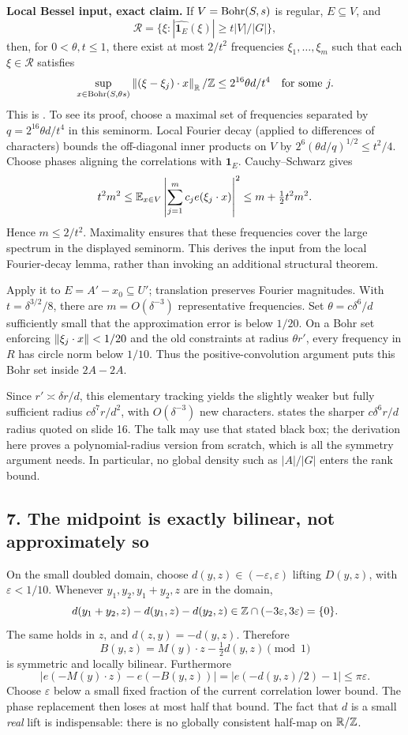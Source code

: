 \textbf{Local Bessel input, exact claim.}
If $V=\operatorname{Bohr}(S,s)$ is regular, $E\subseteq V$, and
\[\mathcal R=\{\xi:|\widehat{\mathbf1_E}(\xi)|\geq t|V|/|G|\},\]
then, for $0<\theta,t\leq1$, there exist at most $2/t^2$ frequencies
$\xi_1,\ldots,\xi_m$ such that each $\xi\in\mathcal R$ satisfies
\[\sup_{x\in\operatorname{Bohr}(S,\theta s)}
\left\|(\xi-\xi_j)\cdot x\right\|_\mathbb R/\mathbb Z\leq2^{16}\theta d/t^4
\quad\text{for some }j.\]
This is . To see its proof, choose a maximal set of
frequencies separated by $q=2^{16}\theta d/t^4$ in this seminorm.
Local Fourier decay (applied to differences of characters) bounds the
off-diagonal inner products on $V$ by
$2^6(\theta d/q)^{1/2}\leq t^2/4$.
Choose phases aligning the correlations with $\mathbf1_E$.
Cauchy--Schwarz gives
\[t^2m^2\leq\mathbb E_{x\in V}\left|\sum_{j=1}^m c_j e(\xi_j\cdot x)\right|^2
\leq m+\tfrac12t^2m^2.\]
Hence $m\leq2/t^2$. Maximality ensures that these frequencies cover
the large spectrum in the displayed seminorm. This derives the input
from the local Fourier-decay lemma, rather than invoking an additional
structural theorem.

Apply it to $E=A'-x_0\subseteq U'$; translation preserves Fourier
magnitudes. With $t=\delta^{3/2}/8$, there are
$m=O(\delta^{-3})$ representative frequencies. Set
$\theta=c\delta^6/d$ sufficiently small that the approximation error
is below $1/20$. On a Bohr set enforcing $\left\|\xi_j\cdot x\right\|<1/20$
and the old constraints at radius $\theta r'$, every frequency in $R$
has circle norm below $1/10$. Thus the positive-convolution argument
puts this Bohr set inside $2A-2A$.

Since $r'\asymp\delta r/d$, this elementary tracking yields the slightly
weaker but fully sufficient radius $c\delta^7r/d^2$, with
$O(\delta^{-3})$ new characters.  states the sharper
$c\delta^6r/d$ radius quoted on slide 16. The talk may use that stated
black box; the derivation here proves a polynomial-radius version from
scratch, which is all the symmetry argument needs. In particular, no
global density such as $|A|/|G|$ enters the rank bound.

\subsection*{7. The midpoint is exactly bilinear, not approximately so}
On the small doubled domain, choose $d(y,z)\in(-\varepsilon,\varepsilon)$
lifting $D(y,z)$, with $\varepsilon<1/10$. Whenever $y_1,y_2,y_1+y_2,z$
are in the domain,
\[d(y_1+y_2,z)-d(y_1,z)-d(y_2,z)\in\mathbb Z\cap(-3\varepsilon,3\varepsilon)=\{0\}.\]
The same holds in $z$, and $d(z,y)=-d(y,z)$. Therefore
\[B(y,z)=M(y)\cdot z-\tfrac12d(y,z)\pmod1\]
is symmetric and locally bilinear. Furthermore
\[|e(-M(y)\cdot z)-e(-B(y,z))|
=|e(-d(y,z)/2)-1|\leq\pi\varepsilon.\]
Choose $\varepsilon$ below a small fixed fraction of the current
correlation lower bound. The phase replacement then loses at most half
that bound. The fact that $d$ is a small \emph{real} lift is indispensable:
there is no globally consistent half-map on $\mathbb R/\mathbb Z$.

